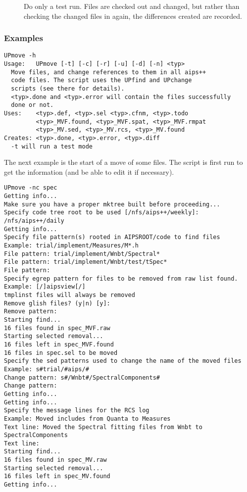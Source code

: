 \begin{description}
\item[]
    Do only a test run. Files are checked out and changed, but rather than
    checking the changed files in again, the differences created are recorded.
\end{description}

\subsubsection*{Examples}

\begin{verbatim}
UPmove -h
Usage:   UPmove [-t] [-c] [-r] [-u] [-d] [-n] <typ>
  Move files, and change references to them in all aips++
  code files. The script uses the UPfind and UPchange 
  scripts (see there for details).
  <typ>.done and <typ>.error will contain the files successfully
  done or not.
Uses:    <typ>.def, <typ>.sel <typ>.cfnm, <typ>.todo
         <typ>_MVF.found, <typ>_MVF.spat, <typ>_MVF.rmpat
         <typ>_MV.sed, <typ>_MV.rcs, <typ>_MV.found
Creates: <typ>.done, <typ>.error, <typ>.diff
  -t will run a test mode
\end{verbatim}

\noindent
The next example is the start of a move of some files. The script is first
run to get the information (and be able to edit it if necessary).

\begin{verbatim}
UPmove -nc spec
Getting info...
Make sure you have a proper mktree built before proceeding...
Specify code tree root to be used [/nfs/aips++/weekly]: /nfs/aips++/daily
Getting info...
Specify file pattern(s) rooted in AIPSROOT/code to find files
Example: trial/implement/Measures/M*.h
File pattern: trial/implement/Wnbt/Spectral*
File pattern: trial/implement/Wnbt/test/tSpec*
File pattern: 
Specify egrep pattern for files to be removed from raw list found.
Example: [/]aipsview[/]
tmplinst files will always be removed
Remove glish files? (y|n) [y]: 
Remove pattern: 
Starting find...
16 files found in spec_MVF.raw
Starting selected removal...
16 files left in spec_MVF.found
16 files in spec.sel to be moved
Specify the sed patterns used to change the name of the moved files
Example: s#trial/#aips/#
Change pattern: s#/Wnbt#/SpectralComponents#
Change pattern: 
Getting info...
Getting info...
Specify the message lines for the RCS log
Example: Moved includes from Quanta to Measures
Text line: Moved the Spectral fitting files from Wnbt to SpectralComponents
Text line: 
Starting find...
16 files found in spec_MV.raw
Starting selected removal...
16 files left in spec_MV.found
Getting info...
\end{verbatim}

